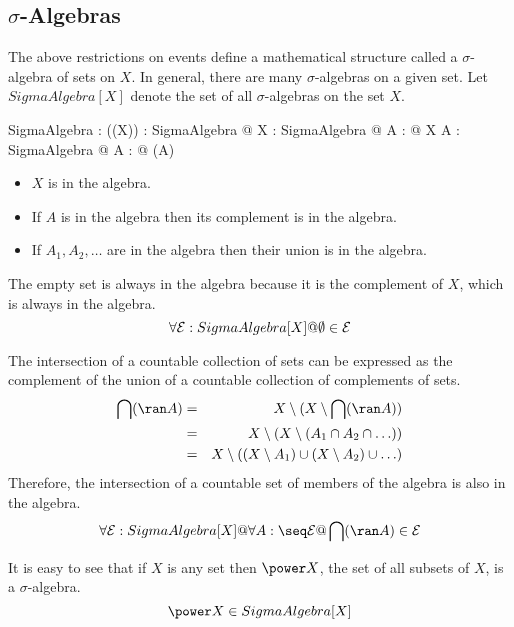 \documentclass{article}
\begin{document}
\subsection{$\sigma$-Algebras}

The above restrictions on events define a mathematical structure called a $\sigma$-algebra of sets on $X$.
In general, there are many $\sigma$-algebras on a given set.
Let $SigmaAlgebra[X]$ denote the set of all $\sigma$-algebras on the set $X$.
\begin{gendef}[X]
	SigmaAlgebra : \power (\power (\power X))
\where
	\forall \calE : SigmaAlgebra @ X \in \calE
\also
	\forall \calE : SigmaAlgebra @ \forall A : \calE @ X \setminus A \in \calE
\also
	\forall \calE : SigmaAlgebra @ \forall A : \seq \calE @ \bigcup (\ran A) \in \calE
\end{gendef}
\begin{itemize}
\item $X$ is in the algebra.
\item If $A$ is in the algebra then its complement is in the algebra.
\item If $A_1, A_2, \ldots$ are in the algebra then their union is in the algebra.
\end{itemize}

The empty set is always in the algebra because it is the complement of $X$, which is always in the algebra.
\begin{equation}
	\forall {\cal E} : SigmaAlgebra[X] @ \emptyset \in {\cal E}
\end{equation}

The intersection of a countable collection of sets can be expressed as the complement of the union of a countable
collection of complements of sets.
\begin{eqnarray}
	\bigcap (\ran A)	& = & X \setminus (X \setminus \bigcap (\ran A)) \\
				& = & X \setminus (X \setminus (A_1 \cap A_2 \cap \ldots)) \nonumber \\
				& = & X \setminus ((X \setminus A_1) \cup (X \setminus A_2) \cup \ldots) \nonumber
\end{eqnarray}
Therefore, the intersection of a countable set of members of the algebra is also in the algebra.
\begin{equation}
	\forall \calE : SigmaAlgebra[X] @ \forall A : \seq \calE @ \bigcap (\ran A) \in \calE
\end{equation}

It is easy to see that if $X$ is any set then $\power X$, the set of all subsets of $X$, is a $\sigma$-algebra.
\begin{equation}
	\power X \in SigmaAlgebra[X]
\end{equation}
\end{document}
